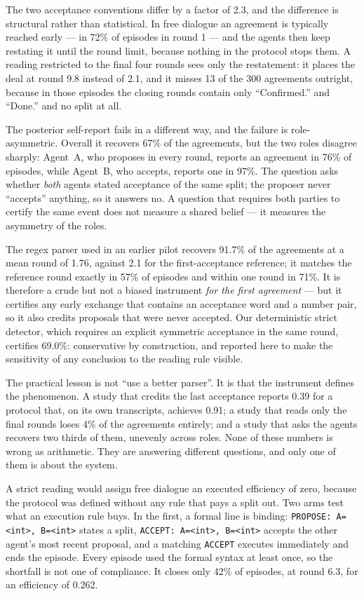 \documentclass[11pt]{article}
\begin{document}
The two acceptance conventions differ by a factor of 2.3, and the difference is structural rather than statistical. In free dialogue an agreement is typically reached early --- in 72\% of episodes in round 1 --- and the agents then keep restating it until the round limit, because nothing in the protocol stops them. A reading restricted to the final four rounds sees only the restatement: it places the deal at round 9.8 instead of 2.1, and it misses 13 of the 300 agreements outright, because in those episodes the closing rounds contain only ``Confirmed.'' and ``Done.'' and no split at all.

The posterior self-report fails in a different way, and the failure is role-asymmetric. Overall it recovers 67\% of the agreements, but the two roles disagree sharply: Agent~A, who proposes in every round, reports an agreement in 76\% of episodes, while Agent~B, who accepts, reports one in 97\%. The question asks whether \emph{both} agents stated acceptance of the same split; the proposer never ``accepts'' anything, so it answers no. A question that requires both parties to certify the same event does not measure a shared belief --- it measures the asymmetry of the roles.

The regex parser used in an earlier pilot recovers 91.7\% of the agreements at a mean round of 1.76, against 2.1 for the first-acceptance reference; it matches the reference round exactly in 57\% of episodes and within one round in 71\%. It is therefore a crude but not a biased instrument \emph{for the first agreement} --- but it certifies any early exchange that contains an acceptance word and a number pair, so it also credits proposals that were never accepted. Our deterministic strict detector, which requires an explicit symmetric acceptance in the same round, certifies 69.0\%: conservative by construction, and reported here to make the sensitivity of any conclusion to the reading rule visible.

The practical lesson is not ``use a better parser''. It is that the instrument defines the phenomenon. A study that credits the last acceptance reports 0.39 for a protocol that, on its own transcripts, achieves 0.91; a study that reads only the final rounds loses 4\% of the agreements entirely; and a study that asks the agents recovers two thirds of them, unevenly across roles. None of these numbers is wrong as arithmetic. They are answering different questions, and only one of them is about the system.

A strict reading would assign free dialogue an executed efficiency of zero, because the protocol was defined without any rule that pays a split out. Two arms test what an execution rule buys. In the first, a formal line is binding: \texttt{PROPOSE: A=<int>, B=<int>} states a split, \texttt{ACCEPT: A=<int>, B=<int>} accepts the other agent's most recent proposal, and a matching \texttt{ACCEPT} executes immediately and ends the episode. Every episode used the formal syntax at least once, so the shortfall is not one of compliance. It closes only 42\% of episodes, at round 6.3, for an efficiency of 0.262.
\end{document}
